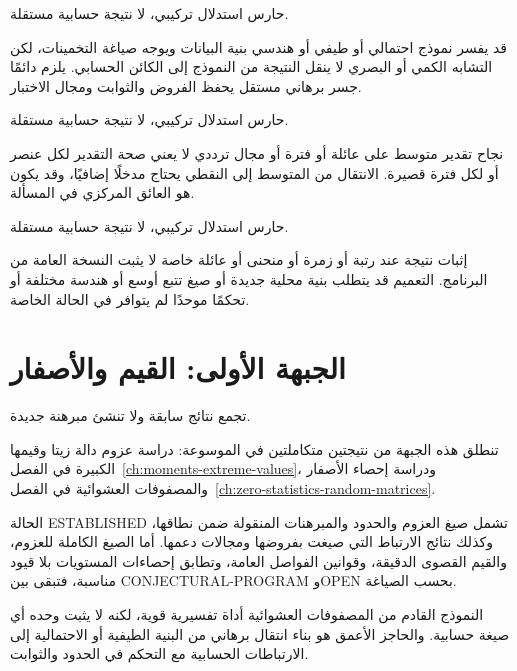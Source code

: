\begin{remark}
\label{rem:ch26-model-not-proof}
\noindent{}\quad حارس استدلال تركيبي، لا نتيجة حسابية مستقلة.\par
قد يفسر نموذج احتمالي أو طيفي أو هندسي بنية البيانات ويوجه صياغة التخمينات، لكن التشابه الكمي أو البصري لا ينقل النتيجة من النموذج إلى الكائن الحسابي. يلزم دائمًا جسر برهاني مستقل يحفظ الفروض والثوابت ومجال الاختبار.
\end{remark}

\begin{remark}
\label{rem:ch26-average-not-pointwise}
\noindent{}\quad حارس استدلال تركيبي، لا نتيجة حسابية مستقلة.\par
نجاح تقدير متوسط على عائلة أو فترة أو مجال ترددي لا يعني صحة التقدير لكل عنصر أو لكل فترة قصيرة. الانتقال من المتوسط إلى النقطي يحتاج مدخلًا إضافيًا، وقد يكون هو العائق المركزي في المسألة.
\end{remark}

\begin{remark}
\label{rem:ch26-special-not-general}
\noindent{}\quad حارس استدلال تركيبي، لا نتيجة حسابية مستقلة.\par
إثبات نتيجة عند رتبة أو زمرة أو منحنى أو عائلة خاصة لا يثبت النسخة العامة من البرنامج. التعميم قد يتطلب بنية محلية جديدة أو صيغ تتبع أوسع أو هندسة مختلفة أو تحكمًا موحدًا لم يتوافر في الحالة الخاصة.
\end{remark}

\section{الجبهة الأولى: القيم والأصفار}

\begin{remark}
\label{map:ch26-values-zeros}
\noindent{}\quad تجمع نتائج سابقة ولا تنشئ مبرهنة جديدة.\par
تنطلق هذه الجبهة من نتيجتين متكاملتين في الموسوعة: دراسة عزوم دالة زيتا وقيمها الكبيرة في الفصل~\ref{ch:moments-extreme-values}، ودراسة إحصاء الأصفار والمصفوفات العشوائية في الفصل~\ref{ch:zero-statistics-random-matrices}.

الحالة \textenglish{ESTABLISHED} تشمل صيغ العزوم والحدود والمبرهنات المنقولة ضمن نطاقها، وكذلك نتائج الارتباط التي صيغت بفروضها ومجالات دعمها. أما الصيغ الكاملة للعزوم، والقيم القصوى الدقيقة، وقوانين الفواصل العامة، وتطابق إحصاءات المستويات بلا قيود مناسبة، فتبقى بين \textenglish{CONJECTURAL-PROGRAM} و\textenglish{OPEN} بحسب الصياغة.

النموذج القادم من المصفوفات العشوائية أداة تفسيرية قوية، لكنه لا يثبت وحده أي صيغة حسابية. والحاجز الأعمق هو بناء انتقال برهاني من البنية الطيفية أو الاحتمالية إلى الارتباطات الحسابية مع التحكم في الحدود والثوابت.
\end{remark}

